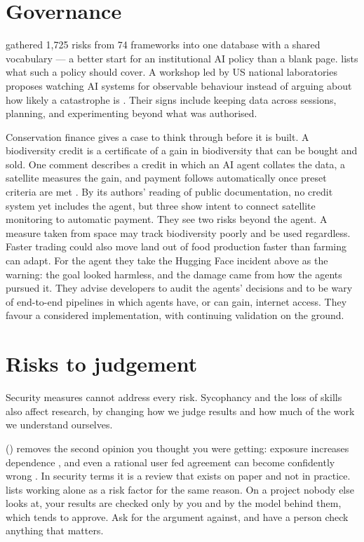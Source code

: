 \section{Governance}

\textcite{slattery2026riskrepository} gathered 1,725 risks from 74 frameworks
into one database with a shared vocabulary --- a better start for an
institutional AI policy than a blank page.  lists what such
a policy should cover. A workshop led by US national laboratories proposes
watching AI systems for observable behaviour instead of arguing about how likely
a catastrophe is \parencite{bauer2026rogueai}. Their signs include keeping data
across sessions, planning, and experimenting beyond what was authorised.

Conservation finance gives a case to think through before it is built.
A biodiversity credit is a certificate of a gain in biodiversity that can be
bought and sold. One comment describes a credit in which an AI agent collates
the data, a satellite measures the gain, and payment follows automatically
once preset criteria are met \parencite{millard2026credits}. By its authors'
reading of public
documentation, no credit system yet includes the agent, but three show intent
to connect satellite monitoring to automatic payment. They see two risks
beyond the agent. A measure taken from space may track biodiversity poorly
and be used regardless. Faster trading could also move land out of food
production faster than farming can adapt. For the agent they take the
Hugging Face incident above as the warning: the goal looked harmless, and
the damage came from how the agents pursued it. They advise developers to
audit the agents' decisions and to be wary of end-to-end pipelines in which
agents have, or can gain, internet access. They favour a considered
implementation, with continuing validation on the ground.

\section{Risks to judgement}

Security measures cannot address every risk. Sycophancy and the loss of skills
also affect research, by changing how we judge results and how much of the
work we understand ourselves.

 () removes the second opinion you thought you
were getting: exposure increases dependence \parencite{cheng2026sycophancy}, and
even a rational user fed agreement can become confidently wrong
\parencite{chandra2026spiraling}. In security terms it is a review that exists
on paper and not in practice. \textcite{jiralerspong2026slopcliff} lists
working alone as a risk factor for the same reason. On a project nobody else
looks at, your results are checked only by you and by the model behind them,
which tends to approve. Ask for the argument against, and have a person check
anything that matters.


